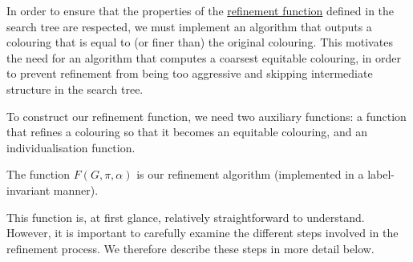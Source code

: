 In order to ensure that the properties of the \hyperref[def: refinement function]{refinement function} defined in the search tree are respected, we must implement an algorithm that outputs a colouring that is equal to (or finer than) the original colouring. This motivates the need for an algorithm that computes a coarsest equitable colouring, in order to prevent refinement from being too aggressive and skipping intermediate structure in the search tree.

To construct our refinement function, we need two auxiliary functions: a function that refines a colouring so that it becomes an equitable colouring, and an individualisation function.

\vspace{0.5em}
\begin{definition}\label{def:refinement_algo}
  The function \emph{$F (G,\pi, \alpha)$} is our refinement algorithm (implemented in a label-invariant manner).
  
  \vspace{0.5em}
  \noindent{}
  \end{definition}


  This function is, at first glance, relatively straightforward to understand. However, it is important to carefully examine the different steps involved in the refinement process. We therefore describe these steps in more detail below.

